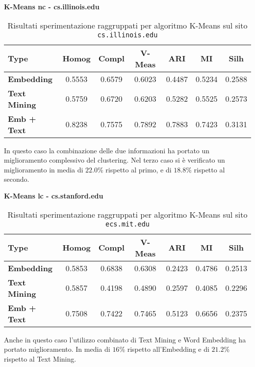 \textbf{K-Means nc - cs.illinois.edu}
\begin{table}[H]
	\begin{tabular}{| l | c | c | c | c | c | c |}
	\hline
	\textbf{Type}  & \textbf{Homog} & \textbf{Compl} & \textbf{V-Meas}  & \textbf{ARI}  & \textbf{MI}  & \textbf{Silh} \\ [3ex] \hline
	\textbf{Embedding} & 0.5553 & 0.6579 & 0.6023 & 0.4487 & 0.5234 & 0.2588\\ [3ex]
	 \hline 
	\textbf{Text Mining} & 0.5759 & 0.6720 & 0.6203 & 0.5282 & 0.5525 & 0.2573\\ [3ex]
	 \hline
	\textbf{Emb + Text} & 0.8238 & 0.7575 & 0.7892 & 0.7883 & 0.7423 & 0.3131\\ [3ex]
	 \hline
	\end{tabular}
	\caption{Risultati sperimentazione raggruppati per algoritmo K-Means sul sito \texttt{cs.illinois.edu}}
	\label{metricheTextEmbedKmeansNcIll}
\end{table}

In questo caso la combinazione delle due informazioni ha portato un miglioramento complessivo del clustering. Nel terzo caso si è verificato un miglioramento in media di $22.0$\% rispetto al primo, e di $18.8$\% rispetto al secondo.

\textbf{K-Means lc - cs.stanford.edu}
\begin{table}[H]
	\begin{tabular}{| l | c | c | c | c | c | c |}
	\hline
	\textbf{Type}  & \textbf{Homog} & \textbf{Compl} & \textbf{V-Meas}  & \textbf{ARI}  & \textbf{MI}  & \textbf{Silh} \\ [3ex] \hline
	\textbf{Embedding} & 0.5853 & 0.6838 & 0.6308 & 0.2423 & 0.4786 & 0.2513\\ [3ex]
	 \hline 
	\textbf{Text Mining} & 0.5857 & 0.4198 & 0.4890 & 0.2597 & 0.4085 & 0.2296\\ [3ex]
	 \hline
	\textbf{Emb + Text} & 0.7508 & 0.7422 & 0.7465 & 0.5123 & 0.6656 & 0.2375\\ [3ex]
	 \hline
	\end{tabular}
	\caption{Risultati sperimentazione raggruppati per algoritmo K-Means sul sito \texttt{ecs.mit.edu}}
	\label{metricheTextEmbedKmeansLcStanford}
\end{table}

Anche in questo caso l'utilizzo combinato di Text Mining e Word Embedding ha portato miglioramento. In media di $16$\% rispetto all'Embedding e di $21.2$\% rispetto al Text Mining. 

